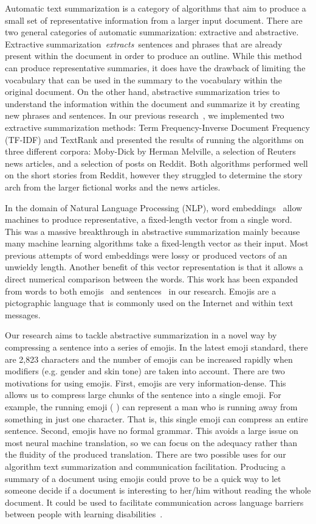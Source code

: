 \documentclass{article}[10]
\newcommand*{\img}[1]{%
  \raisebox{-.3\baselineskip}{%
    \texttt{[image: \#1]}%
  }%
}
\begin{document}
Automatic text summarization is a category of algorithms that aim to
produce a small set of representative information from a larger input
document. There are two general categories of automatic summarization:
extractive and abstractive. Extractive
summarization~\emph{extracts~}sentences and phrases that are already
present within the document in order to produce an outline. While this
method can produce representative summaries, it does have the drawback
of limiting the vocabulary that can be used in the summary to the
vocabulary within the original document. On the other hand, abstractive
summarization tries to understand the information within the document
and summarize it by creating new phrases and sentences. In our previous
research~\cite{day_extractive}, we implemented two extractive summarization
methods: Term Frequency-Inverse Document Frequency (TF-IDF) and TextRank
and presented the results of running the algorithms on three different
corpora: Moby-Dick by Herman Melville, a selection of Reuters news
articles, and a selection of posts on Reddit. Both algorithms performed
well on the short stories from Reddit, however they struggled to
determine the story arch from the larger fictional works and the news
articles.


In the domain of Natural Language Processing (NLP), word
embeddings~\cite{mikolov2013efficient} allow machines to produce representative,
a fixed-length vector from a single word. This was a massive
breakthrough in abstractive summarization mainly because many machine
learning algorithms take a fixed-length vector as their input. Most
previous attempts of word embeddings were lossy or produced vectors of
an unwieldy length. Another benefit of this vector representation is
that it allows a direct numerical comparison between the words. This
work has been expanded from words to both emojis~\cite{Eisner_2016}
and sentences~\cite{pg2017unsu} in our research. Emojis are a
pictographic language that is commonly used on the Internet and within
text messages.

Our research aims to tackle abstractive summarization in a novel way
by compressing a sentence into a series of emojis. In the latest emoji
standard, there are 2,823 characters and the number of emojis can be
increased rapidly when modifiers (e.g. gender and skin tone) are taken
into account. There are two motivations for using emojis. First, emojis
are very information-dense. This allows us to compress large chunks of
the sentence into a single emoji. For example, the running emoji
(\img{emojis/1f3c3.png}) can represent a man who is running away from something in just one
character. That is, this single emoji can compress an entire sentence.
Second, emojis have no formal grammar. This avoids a large issue on most
neural machine translation, so we can focus on the adequacy rather than
the fluidity of the produced translation. There are two possible uses
for our algorithm text summarization and communication facilitation.
Producing a summary of a document using emojis could prove to be a
quick way to let someone decide if a document is interesting to her/him
without reading the whole document. It could be used to facilitate
communication across language barriers between people with learning
disabilities~\cite{vandeghinste2017translating}.
\end{document}
